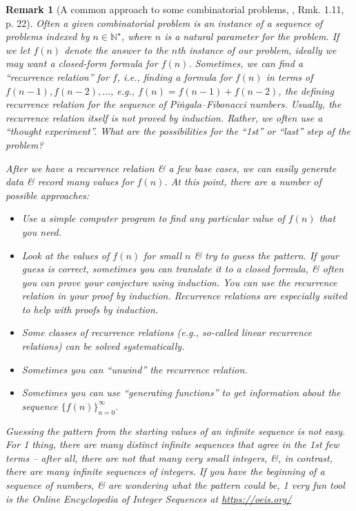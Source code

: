 \documentclass[oneside]{book}
\newtheorem{remark}{Remark}
\begin{document}
\begin{remark}[A common approach to some combinatorial problems, \cite{Shahriari2022}, Rmk. 1.11, p. 22]
	Often a given combinatorial problem is an instance of a sequence of problems indexed by $n\in\mathbb{N}^\star$, where $n$ is a natural parameter for the problem. If we let $f(n)$ denote the answer to the $n$th instance of our problem, ideally we may want a closed-form formula for $f(n)$. Sometimes, we can find a ``recurrence relation'' for $f$, i.e., finding a formula for $f(n)$ in terms of $f(n - 1),f(n - 2),\ldots$, e.g., $f(n) = f(n - 1) + f(n - 2)$, the defining recurrence relation for the sequence of Pi\.{n}gala--Fibonacci numbers. Usually, the recurrence relation itself is not proved by induction. Rather, we often use a ``thought experiment''. What are the possibilities for the ``1st'' or ``last'' step of the problem? 
	
	After we have a recurrence relation \& a few base cases, we can easily generate data \& record many values for $f(n)$. At this point, there are a number of possible approaches:
	\begin{itemize}
		\item Use a simple computer program to find any particular value of $f(n)$ that you need.
		\item Look at the values of $f(n)$ for small $n$ \& try to guess the pattern. If your guess is correct, sometimes you can translate it to a closed formula, \& often you can prove your conjecture using induction. You can use the recurrence relation in your proof by induction. Recurrence relations are especially suited to help with proofs by induction.
		\item Some classes of recurrence relations (e.g., so-called linear recurrence relations) can be solved systematically.
		\item Sometimes you can ``unwind'' the recurrence relation.
		\item Sometimes you can use ``generating functions'' to get information about the sequence $\{f(n)\}_{n=0}^\infty$.
	\end{itemize}
	Guessing the pattern from the starting values of an infinite sequence is not easy. For 1 thing, there are many distinct infinite sequences that agree in the 1st few terms -- after all, there are not that many very small integers, \&, in contrast, there are many infinite sequences of integers. If you have the beginning of a sequence of numbers, \& are wondering what the pattern could be, 1 very fun tool is the \emph{Online Encyclopedia of Integer Sequences} at \url{https://oeis.org/}
\end{remark}
\end{document}
